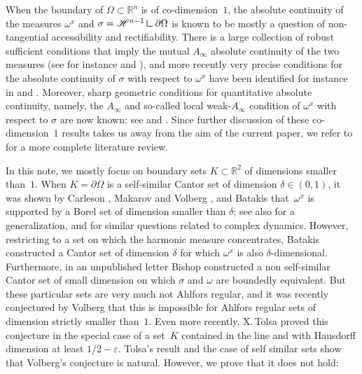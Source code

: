 \documentclass[10pt]{amsart}
\numberwithin{equation}{section}
\theoremstyle{plain}
\theoremstyle{definition}
\newcommand{\R}{\mathbb{R}}
\renewcommand{\d}{\partial}
\newcommand{\mres}{\mathbin{\vrule height 1.6ex depth 0pt width
0.13ex\vrule height 0.13ex depth 0pt width 1.3ex}}
\begin{document}
When the boundary of $\Omega \subset \R^n$ is of co-dimension~$1$,
the absolute continuity of the measures $\omega^x$ and
$\sigma = \mathscr{H}^{n-1} \mres \partial \Omega$ is known to be mostly
a question of non-tangential accessibility and rectifiability. There is a large collection of robust sufficient conditions
that imply the mutual $A_\infty$ absolute continuity of the two measures (see for instance \cite{Dah} and \cite{DJ}), and more recently very precise conditions for the absolute continuity of $\sigma$ with respect to $\omega^x$ have been identified for instance in \cite{AHMMMTV2016GAFA} and \cite{ABHM19}. Moreover, sharp geometric conditions for quantitative absolute continuity, namely, the $A_\infty$ and so-called local weak-$A_\infty$ condition of $\omega^x$ with respect to $\sigma$ are now known: see \cite{Azzam2021} and \cite{AHMMT2020Inventiones}. Since further discussion of these co-dimension~$1$ results takes us away from the aim of the current paper, we refer to \cite{AHMMMTV2016GAFA} for a more complete literature review.\enlargethispage{-\baselineskip}

In this note, we mostly
focus on boundary sets $K \!\subset\! \R^2$ of dimensions smaller than~$1$.
When $K = \d\Omega$ is a self-similar Cantor set of dimension $\delta\in (0,1)$, it
was shown by Carleson \cite{Carleson1985},
Makarov and Volberg \cite{MakarovVolberg1986},
and Batakis \cite{Batakis1996} that~$\omega^x$ is supported by a Borel set of dimension smaller than $\delta$;
see also \cite{BatakisZdunik2015} for a generalization, and
\cite{Volberg1992, Volberg1993, Zdunik1997} for similar questions related to complex dynamics.
However, restricting to a set on which the harmonic measure concentrates, Batakis constructed a Cantor set
of dimension $\delta$ for which $\omega^x$ is also $\delta$-dimensional.
Furthermore, in an unpublished letter Bishop constructed a non self-similar Cantor set of small dimension
on which $\sigma$ and $\omega$ are boundedly equivalent.
But these particular sets are very much not Ahlfors regular, and it
was recently conjectured by Volberg \cite[Conj.\,1.9]{Volberg2022onephase}
that this is impossible for Ahlfors regular sets of dimension strictly smaller than~$1$.
Even more recently, X.\,Tolsa \cite{Tolsa2023ADreg} proved this conjecture in the special case of a set~$K$ contained in the line and with Hausdorff dimension at least $1/2-\varepsilon$.
Tolsa's result and the case of self similar sets show that Volberg's conjecture is natural.
However, we prove that it does not hold:
\end{document}

